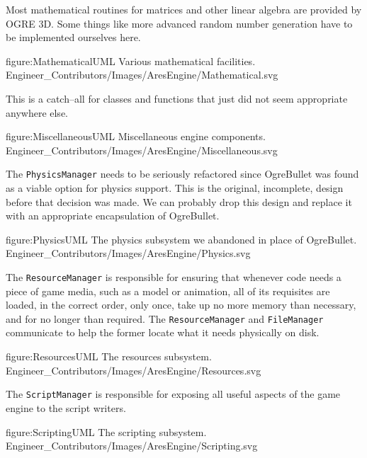 \page 
{}
Most mathematical routines for matrices and other linear algebra are provided by OGRE 3D. Some things like more advanced random number generation have to be implemented ourselves here.

\FullPageDiagram
    {figure:MathematicalUML}
    {Various mathematical facilities.}
    {Engineer_Contributors/Images/AresEngine/Mathematical.svg}

\page 
{}
This is a catch--all for classes and functions that just did not seem appropriate anywhere else.

\FullPageDiagram
    {figure:MiscellaneousUML}
    {Miscellaneous engine components.}
    {Engineer_Contributors/Images/AresEngine/Miscellaneous.svg}

\page 
{}
The {\tt PhysicsManager} needs to be seriously refactored since OgreBullet was found as a viable option for physics support. This is the original, incomplete, design before that decision was made. We can probably drop this design and replace it with an appropriate encapsulation of OgreBullet.

\FullPageDiagram
    {figure:PhysicsUML}
    {The physics subsystem we abandoned in place of OgreBullet.}
    {Engineer_Contributors/Images/AresEngine/Physics.svg}

\page 
{}
The {\tt ResourceManager} is responsible for ensuring that whenever code needs a piece of game media, such as a model or animation, all of its requisites are loaded, in the correct order, only once, take up no more memory than necessary, and for no longer than required. The {\tt ResourceManager} and {\tt FileManager} communicate to help the former locate what it needs physically on disk.

\FullPageDiagram
    {figure:ResourcesUML}
    {The resources subsystem.}
    {Engineer_Contributors/Images/AresEngine/Resources.svg}

\page 
{}
The {\tt ScriptManager} is responsible for exposing all useful aspects of the game engine to the script writers.

\FullPageDiagram
    {figure:ScriptingUML}
    {The scripting subsystem.}
    {Engineer_Contributors/Images/AresEngine/Scripting.svg}

